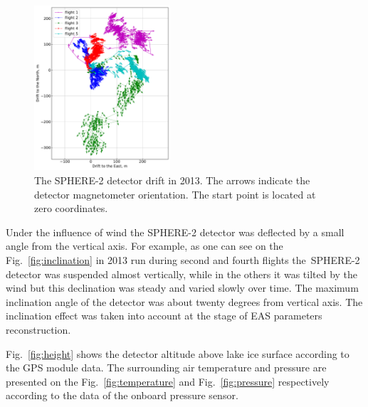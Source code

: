 \documentclass[final,5p,times,twocolumn]{elsarticle}
\begin{document}
\begin{figure}[tb]
    \includegraphics[width=0.45\textwidth]{GPS+quiver.pdf}\hspace{2pc}%
    \caption{The SPHERE-2 detector drift in 2013. The arrows indicate the detector magnetometer orientation. The start point is located at zero coordinates.}
\label{fig:gps_compass}
\end{figure}

Under the influence of wind the SPHERE-2 detector was deflected by a small angle from the vertical axis. For example, as one can see on the Fig.~\ref{fig:inclination} in 2013 run during second and fourth flights the~\mbox{SPHERE-2} detector was suspended almost vertically, while in the others it was tilted by the wind but this declination was steady and varied slowly over time. The maximum inclination angle of the detector was about twenty degrees from vertical axis. The inclination effect was taken into account at the stage of EAS parameters reconstruction.

Fig.~\ref{fig:height} shows the detector altitude above lake ice surface according to the GPS module data. The surrounding air temperature and pressure are presented on the Fig.~\ref{fig:temperature} and Fig.~\ref{fig:pressure} respectively according to the data of the onboard pressure sensor.
\end{document}
